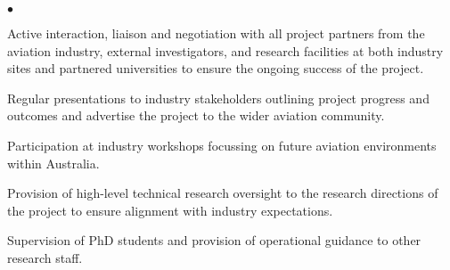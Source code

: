\documentclass[margin,line]{resume}
\newenvironment{list1}{
  \begin{list}{}{%
      \setlength{\itemsep}{0in}
      \setlength{\parsep}{0in} \setlength{\parskip}{0in}
      \setlength{\topsep}{0in} \setlength{\partopsep}{0in}
      \setlength{\leftmargin}{0.17in}}}{\end{list}}
\newenvironment{list2}{
  \begin{list}{$\bullet$}{%
      \setlength{\itemsep}{0in}
      \setlength{\parsep}{0in} \setlength{\parskip}{0in}
      \setlength{\topsep}{0in} \setlength{\partopsep}{0in}
      \setlength{\leftmargin}{0.2in}}}{\end{list}}
\begin{document}
\begin{resume}
\begin{list1}
\begin{list2}
\item Active interaction, liaison and negotiation with all project partners from the aviation industry, external investigators, and research facilities at both industry sites and partnered universities to ensure the ongoing success of the project.
\item Regular presentations to industry stakeholders outlining project progress and outcomes and advertise the project to the wider aviation community.
\item Participation at industry workshops focussing on future aviation environments within Australia.
\item Provision of high-level technical research oversight to the research directions of the project to ensure alignment with industry expectations.
\item Supervision of PhD students and provision of operational guidance to other research staff.
\end{list2}
\end{list1}
\newpage

\end{resume}
\end{document}
